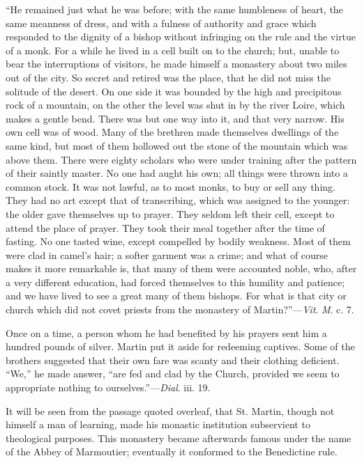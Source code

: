 ``He remained just what he was before; with the same humbleness
of heart, the same meanness of dress, and with a fulness of authority
and grace which responded to the dignity of a bishop without
infringing on the rule and the virtue of a monk. For a while he lived
in a cell built on to the church; but, unable to bear the
interruptions of visitors, he made himself a monastery about two miles
out of the city. So secret and retired was the place, that he did not
miss the solitude of the desert. On one side it was bounded by the
high and precipitous rock of a mountain, on the other the level was
shut in by the river Loire, which makes a gentle bend. There was but
one way into it, and that very narrow. His own cell was of wood. Many
of the brethren made themselves dwellings of the same kind, but most
of them hollowed out the stone of the mountain which was above them.
There were eighty scholars who were under training after the pattern
of their saintly master. No one had aught his own; all things were
thrown into a common stock. It was not lawful, as to most monks, to
buy or sell any thing. They had no art except that of transcribing,
which was assigned to the younger: the older gave themselves up to
prayer. They seldom left their cell, except to attend the place of
prayer. They took their meal together after the time of fasting. No
one tasted wine, except compelled by bodily weakness. Most of them
were clad in camel's hair; a softer garment was a crime; and what of
course makes it more remarkable is, that many of them were accounted
noble, who, after a very different education, had forced themselves to
this humility and patience; and we have lived to see a great many of
them bishops. For what is that city or church which did not covet
priests from the monastery of Martin?''—\emph{Vit}. \emph{M}. c.
7.

Once on a time, a person whom he had benefited by his prayers sent
him a hundred pounds of silver. Martin put it aside for redeeming
captives. Some of the brothers suggested that their own fare was
scanty and their clothing deficient. ``We,'' he made
answer, ``are fed and clad by the Church, provided we seem to
appropriate nothing to ourselves.''—\emph{Dial}. iii. 19.

It will be seen from the passage quoted overleaf, that St. Martin,
though not himself a man of learning, made his monastic institution
subservient to theological purposes. This monastery became afterwards
famous under the name of the Abbey of Marmoutier; eventually it
conformed to the Benedictine rule.

